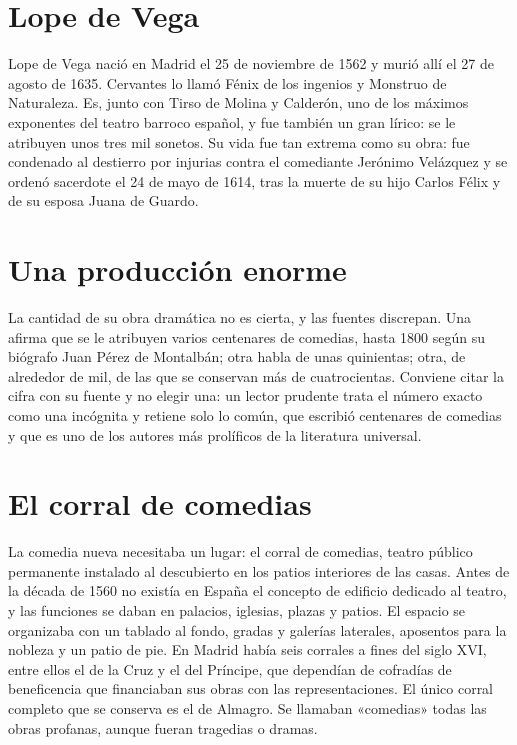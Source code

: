 \documentclass{book}
\begin{document}

\section{Lope de Vega}

Lope de Vega nació en Madrid el 25 de noviembre de 1562 y murió allí el 27 de agosto de 1635. Cervantes lo llamó Fénix de los ingenios y Monstruo de Naturaleza. Es, junto con Tirso de Molina y Calderón, uno de los máximos exponentes del teatro barroco español, y fue también un gran lírico: se le atribuyen unos tres mil sonetos. Su vida fue tan extrema como su obra: fue condenado al destierro por injurias contra el comediante Jerónimo Velázquez y se ordenó sacerdote el 24 de mayo de 1614, tras la muerte de su hijo Carlos Félix y de su esposa Juana de Guardo.


\section{Una producción enorme}

La cantidad de su obra dramática no es cierta, y las fuentes discrepan. Una afirma que se le atribuyen varios centenares de comedias, hasta 1800 según su biógrafo Juan Pérez de Montalbán; otra habla de unas quinientas; otra, de alrededor de mil, de las que se conservan más de cuatrocientas. Conviene citar la cifra con su fuente y no elegir una: un lector prudente trata el número exacto como una incógnita y retiene solo lo común, que escribió centenares de comedias y que es uno de los autores más prolíficos de la literatura universal.


\section{El corral de comedias}

La comedia nueva necesitaba un lugar: el corral de comedias, teatro público permanente instalado al descubierto en los patios interiores de las casas. Antes de la década de 1560 no existía en España el concepto de edificio dedicado al teatro, y las funciones se daban en palacios, iglesias, plazas y patios. El espacio se organizaba con un tablado al fondo, gradas y galerías laterales, aposentos para la nobleza y un patio de pie. En Madrid había seis corrales a fines del siglo XVI, entre ellos el de la Cruz y el del Príncipe, que dependían de cofradías de beneficencia que financiaban sus obras con las representaciones. El único corral completo que se conserva es el de Almagro. Se llamaban «comedias» todas las obras profanas, aunque fueran tragedias o dramas.
\end{document}
